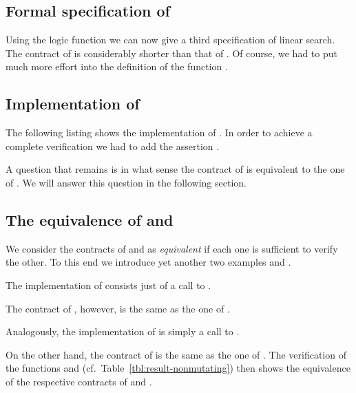 \subsection{Formal specification of \findiii}

Using the logic function \Find we can now give a third specification of linear search.
The contract of  is considerably shorter than that of .
Of course, we had to put much more effort into the definition of the \acsl
function .



\clearpage

\subsection{Implementation of \findiii}

The following listing shows the implementation of .
In order to achieve a complete verification we had to add the assertion .



A question that remains is in what sense the contract of  is equivalent to
the one of .
We will answer this question in the following section.

\subsection{The equivalence of \findii and \findiii}

We consider the contracts of  and  as \emph{equivalent} 
if each one is sufficient to verify the other.
To this end we introduce yet another two examples \findiv and \findv.

The implementation of  consists just of a call to \findiii.



\clearpage

The contract of , however, is the same as the one of .



Analogously, the implementation of  is simply a call to \findii.



On the other hand, the contract of  is the same as the one of .
%
The verification of the functions \findiv and \findv 
(cf.\ Table~\ref{tbl:result-nonmutating}) then shows the equivalence
of the respective contracts of  and .



\clearpage

